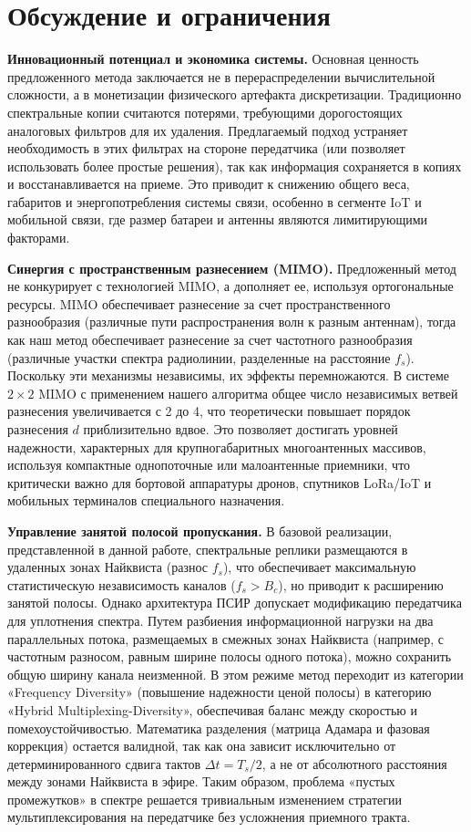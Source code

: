 \documentclass[a4paper,12pt]{article}
\numberwithin{equation}{section}
\begin{document}
\section{Обсуждение и ограничения}

\textbf{Инновационный потенциал и экономика системы.}
Основная ценность предложенного метода заключается не в перераспределении вычислительной сложности, а в монетизации физического артефакта дискретизации. Традиционно спектральные копии считаются потерями, требующими дорогостоящих аналоговых фильтров для их удаления. Предлагаемый подход устраняет необходимость в этих фильтрах на стороне передатчика (или позволяет использовать более простые решения), так как информация сохраняется в копиях и восстанавливается на приеме. Это приводит к снижению общего веса, габаритов и энергопотребления системы связи, особенно в сегменте IoT и мобильной связи, где размер батареи и антенны являются лимитирующими факторами.

\textbf{Синергия с пространственным разнесением (MIMO).}
Предложенный метод не конкурирует с технологией MIMO, а дополняет ее, используя ортогональные ресурсы. MIMO обеспечивает разнесение за счет пространственного разнообразия (различные пути распространения волн к разным антеннам), тогда как наш метод обеспечивает разнесение за счет частотного разнообразия (различные участки спектра радиолинии, разделенные на расстояние $f_s$). Поскольку эти механизмы независимы, их эффекты перемножаются. В системе $2 \times 2$ MIMO с применением нашего алгоритма общее число независимых ветвей разнесения увеличивается с 2 до 4, что теоретически повышает порядок разнесения $d$ приблизительно вдвое. Это позволяет достигать уровней надежности, характерных для крупногабаритных многоантенных массивов, используя компактные однопоточные или малоантенные приемники, что критически важно для бортовой аппаратуры дронов, спутников LoRa/IoT и мобильных терминалов специального назначения.

\textbf{Управление занятой полосой пропускания.}
В базовой реализации, представленной в данной работе, спектральные реплики размещаются в удаленных зонах Найквиста (разнос $f_s$), что обеспечивает максимальную статистическую независимость каналов ($f_s > B_c$), но приводит к расширению занятой полосы. Однако архитектура ПСИР допускает модификацию передатчика для уплотнения спектра. Путем разбиения информационной нагрузки на два параллельных потока, размещаемых в смежных зонах Найквиста (например, с частотным разносом, равным ширине полосы одного потока), можно сохранить общую ширину канала неизменной. В этом режиме метод переходит из категории «Frequency Diversity» (повышение надежности ценой полосы) в категорию «Hybrid Multiplexing-Diversity», обеспечивая баланс между скоростью и помехоустойчивостью. Математика разделения (матрица Адамара и фазовая коррекция) остается валидной, так как она зависит исключительно от детерминированного сдвига тактов $\Delta t = T_s/2$, а не от абсолютного расстояния между зонами Найквиста в эфире. Таким образом, проблема «пустых промежутков» в спектре решается тривиальным изменением стратегии мультиплексирования на передатчике без усложнения приемного тракта.
\end{document}
